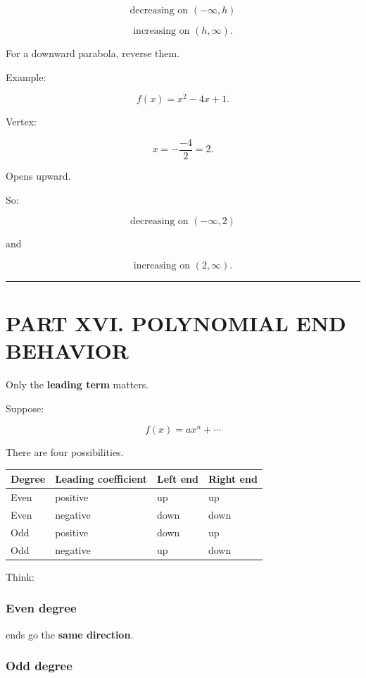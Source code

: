 \documentclass[
]{article}
\newcounter{none} %
\begin{document}
\[
\boxed{\text{decreasing on }(-\infty,h)}
\]

\[
\boxed{\text{increasing on }(h,\infty)}.
\]

For a downward parabola, reverse them.

Example:

\[
f(x)=x^2-4x+1.
\]

Vertex:

\[
x=-\frac{-4}{2}=2.
\]

Opens upward.

So:

\[
\boxed{\text{decreasing on }(-\infty,2)}
\]

and

\[
\boxed{\text{increasing on }(2,\infty)}.
\]

\begin{center}\rule{0.5\linewidth}{0.5pt}\end{center}

\section{PART XVI. POLYNOMIAL END
BEHAVIOR}\label{part-xvi.-polynomial-end-behavior}

Only the \textbf{leading term} matters.

Suppose:

\[
f(x)=ax^n+\cdots
\]

There are four possibilities.

{\def\LTcaptype{none} %
\begin{longtable}[]{@{}llll@{}}
\toprule\noalign{}
Degree & Leading coefficient & Left end & Right end \\
\midrule\noalign{}
\endhead
\bottomrule\noalign{}
\endlastfoot
Even & positive & up & up \\
Even & negative & down & down \\
Odd & positive & down & up \\
Odd & negative & up & down \\
\end{longtable}
}

Think:

\subsubsection{Even degree}\label{even-degree}

ends go the \textbf{same direction}.

\subsubsection{Odd degree}\label{odd-degree}
\end{document}
